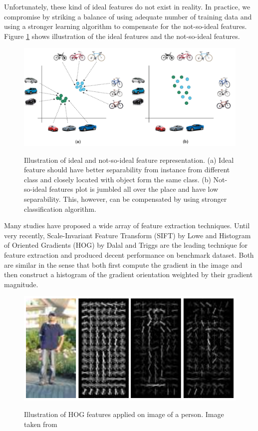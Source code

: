 \documentclass[a4paper,11pt]{kth-mag}
\begin{document}
Unfortunately, these kind of ideal features do not exist in reality. In practice, we compromise by striking a balance of using adequate number of training data and using a stronger learning algorithm to compensate for the not-so-ideal features. Figure \ref{fig:feature} shows illustration of the ideal features and the not-so-ideal features.

\begin{figure}[h]
\centering
\includegraphics[scale=0.4]{image/ideal_feature.png}
\label{fig:feature}
\caption{Illustration of ideal and not-so-ideal feature representation. (a) Ideal feature should have better separability from instance from different class and closely located with object form the same class. (b) Not-so-ideal features plot is jumbled all over the place and have low separability. This, however, can be compensated by using stronger classification algorithm.}
\end{figure}

Many studies have proposed a wide array of feature extraction techniques. Until very recently, Scale-Invariant Feature Transform (SIFT) by Lowe \cite{lowe2004sift} and Histogram of Oriented Gradients (HOG) by Dalal and Triggs \cite{dalal2005hog} are the leading technique for feature extraction and produced decent performance on benchmark dataset. Both are similar in the sense that both first compute the gradient in the image and then construct a histogram of the gradient orientation weighted by their gradient magnitude.

\begin{figure}[h]
\centering
\includegraphics[scale=0.4]{image/hog.png}
\label{fig:hog}
\caption{Illustration of HOG features applied on image of a person. Image taken from \cite{dalal2005hog}}
\end{figure}
\end{document}
